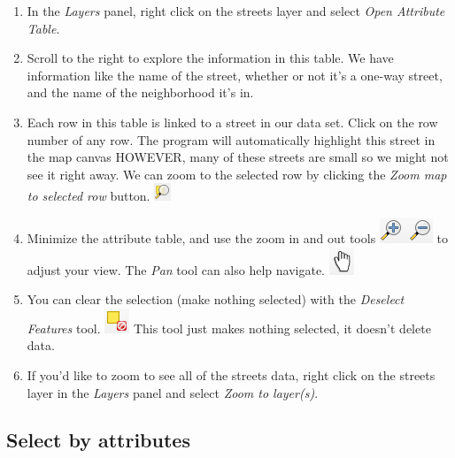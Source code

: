 \documentclass[
]{article}
\providecommand{\tightlist}{%
  \setlength{\itemsep}{0pt}\setlength{\parskip}{0pt}}
\begin{document}
\begin{enumerate}
\def\labelenumi{\arabic{enumi}.}
\tightlist
\item
  In the \emph{Layers} panel, right click on the streets layer and select \emph{Open Attribute Table}.
\item
  Scroll to the right to explore the information in this table. We have information like the name of the street, whether or not it's a one-way street, and the name of the neighborhood it's in.
\item
  Each row in this table is linked to a street in our data set. Click on the row number of any row. The program will automatically highlight this street in the map canvas HOWEVER, many of these streets are small so we might not see it right away. We can zoom to the selected row by clicking the \emph{Zoom map to selected row} button. \includegraphics{./images/Tool_ZoomToSelection.PNG}
\item
  Minimize the attribute table, and use the zoom in and out tools \includegraphics{./images/Tool_ZoomInOut.PNG} to adjust your view. The \emph{Pan} tool can also help navigate. \includegraphics{./images/Tool_Pan.PNG}\\
\item
  You can clear the selection (make nothing selected) with the \emph{Deselect Features} tool. \includegraphics{./images/Tool_Deselect.PNG} This tool just makes nothing selected, it doesn't delete data.
\item
  If you'd like to zoom to see all of the streets data, right click on the streets layer in the \emph{Layers} panel and select \emph{Zoom to layer(s)}.
\end{enumerate}

\hypertarget{select-by-attributes}{%
\subsection{Select by attributes}\label{select-by-attributes}}
\end{document}
